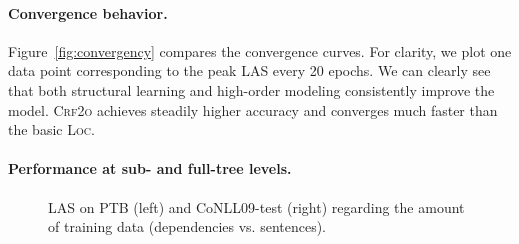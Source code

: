 \documentclass[11pt,a4paper]{article}
\begin{document}
\paragraph{Convergence behavior.}



Figure~\ref{fig:convergency} compares the convergence curves. For clarity, we plot one data point corresponding to the peak LAS every 20 epochs.
We can clearly see that both structural learning and high-order modeling
consistently improve the model.
\textsc{Crf2o} achieves steadily higher accuracy and converges much faster than the basic \textsc{Loc}.




\paragraph{Performance at sub- and full-tree levels.}

\begin{figure}[tb]
\centering
{}
\caption{
 LAS on PTB (left) and CoNLL09-test (right) regarding the amount of training data (dependencies vs. sentences).
}
\label{fig:part-gap}
\end{figure}
\end{document}
